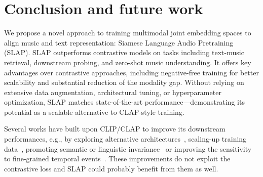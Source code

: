 \documentclass{article}
\begin{document}
\section{Conclusion and future work}


We propose a novel approach to training multimodal joint embedding spaces to align music and text representation: Siamese Language Audio Pretraining (SLAP). SLAP outperforms contrastive models on tasks including text-music retrieval, downstream probing, and zero-shot music understanding. It offers key advantages over contrastive approaches, including negative-free training for better scalability and substantial reduction of the modality gap. Without relying on extensive data augmentation, architectural tuning, or hyperparameter optimization, SLAP matches state-of-the-art performance—demonstrating its potential as a scalable alternative to CLAP-style training.

Several works have built upon CLIP/CLAP to improve its downstream performances, e.g., by exploring alternative architectures~\cite{elizalde2023clap,CyCLAP}, scaling-up training data~\cite{ghosh2025reclap,AudioFlamingo2}, promoting semantic or linguistic invariance~\cite{MaskCLIP,AudioFlamingo2} or improving the sensitivity to fine-grained temporal events~\cite{yuan2024t,wu2024collap}.
These improvements do not exploit the contrastive loss and SLAP could probably benefit from them as well.
\end{document}
